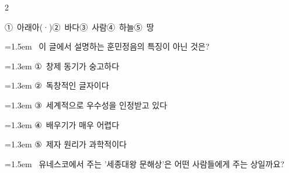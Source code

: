 \documentclass[11pt, a4paper]{article}
\begin{document}
\begin{multicols}{2}
\begin{minipage}{\columnwidth}
\vspace{0.5mm}
\noindent
\mbox{①~아래아(·)}\hspace{1em}\mbox{②~바다}\hspace{1em}\mbox{③~사람}\hspace{1em}\mbox{④~하늘}\hspace{1em}\mbox{⑤~땅}

\vspace{4mm}
\end{minipage}
\par

\noindent\begin{minipage}{\columnwidth}
\vspace{2mm}
{\hangindent=1.5em  ~이 글에서 설명하는 훈민정음의 특징이 아닌 것은?\par}

\vspace{0.5mm}
{\hangindent=1.3em  \noindent\hspace{0.3em}①~창제 동기가 숭고하다\par}
{\hangindent=1.3em  \noindent\hspace{0.3em}②~독창적인 글자이다\par}
{\hangindent=1.3em  \noindent\hspace{0.3em}③~세계적으로 우수성을 인정받고 있다\par}
{\hangindent=1.3em  \noindent\hspace{0.3em}④~배우기가 매우 어렵다\par}
{\hangindent=1.3em  \noindent\hspace{0.3em}⑤~제자 원리가 과학적이다\par}
\vspace{4mm}
\end{minipage}
\par

\noindent\begin{minipage}{\columnwidth}
\vspace{2mm}
{\hangindent=1.5em  ~유네스코에서 주는 '세종대왕 문해상'은 어떤 사람들에게 주는 상일까요?\par}


\end{minipage}
\end{multicols}
\end{document}
